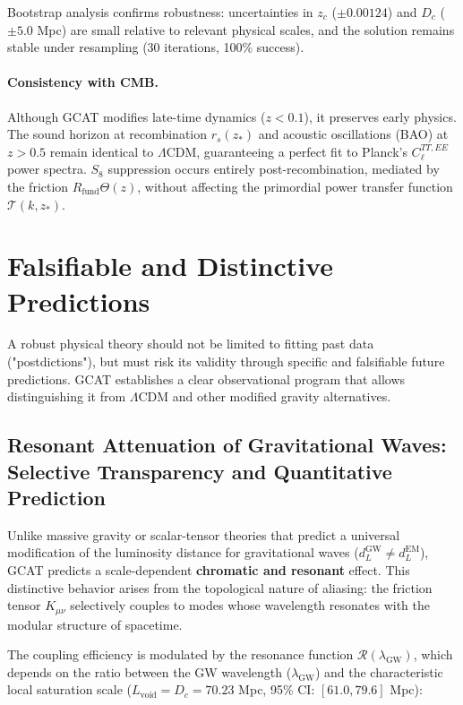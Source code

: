 \documentclass[12pt, a4paper]{article}
\theoremstyle{plain}
\theoremstyle{definition}
\begin{document}
Bootstrap analysis confirms robustness: uncertainties in $z_c$ ($\pm 0.00124$) and $D_c$ ($\pm 5.0$ Mpc) are small relative to relevant physical scales, and the solution remains stable under resampling (30 iterations, 100\% success).

\paragraph{Consistency with CMB.} 
Although GCAT modifies late-time dynamics ($z < 0.1$), it preserves early physics. The sound horizon at recombination $r_s(z_*)$ and acoustic oscillations (BAO) at $z > 0.5$ remain identical to $\Lambda$CDM, guaranteeing a perfect fit to Planck's $C_\ell^{TT,EE}$ power spectra. $S_8$ suppression occurs entirely post-recombination, mediated by the friction $R_{\text{fund}}\Theta(z)$, without affecting the primordial power transfer function $\mathcal{T}(k,z_*)$.

\section{Falsifiable and Distinctive Predictions}
\label{sec:predictions}

A robust physical theory should not be limited to fitting past data ("postdictions"), but must risk its validity through specific and falsifiable future predictions. GCAT establishes a clear observational program that allows distinguishing it from $\Lambda$CDM and other modified gravity alternatives.

\subsection{Resonant Attenuation of Gravitational Waves: Selective Transparency and Quantitative Prediction}

Unlike massive gravity or scalar-tensor theories that predict a universal modification of the luminosity distance for gravitational waves ($d_L^{\text{GW}} \neq d_L^{\text{EM}}$), GCAT predicts a scale-dependent \textbf{chromatic and resonant} effect. This distinctive behavior arises from the topological nature of aliasing: the friction tensor $K_{\mu\nu}$ selectively couples to modes whose wavelength resonates with the modular structure of spacetime.

The coupling efficiency is modulated by the resonance function $\mathcal{R}(\lambda_{\text{GW}})$, which depends on the ratio between the GW wavelength ($\lambda_{\text{GW}}$) and the characteristic local saturation scale ($L_{\text{void}} = D_c = 70.23$ Mpc, 95\% CI: $[61.0, 79.6]$ Mpc):
\end{document}
